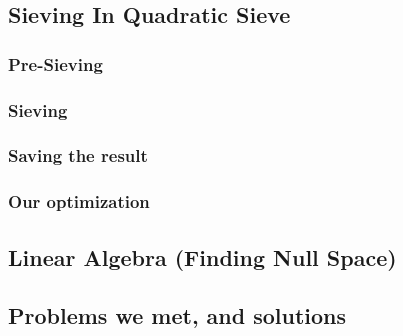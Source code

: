 \documentclass[12pt]{article} %
\begin{document}
\subsection {Sieving In Quadratic Sieve}



\subsubsection {Pre-Sieving}

\subsubsection {Sieving}

\subsubsection {Saving the result}

\subsubsection {Our optimization}

\subsection {Linear Algebra (Finding Null Space) }

\subsection {Problems we met, and solutions}
\end{document}
